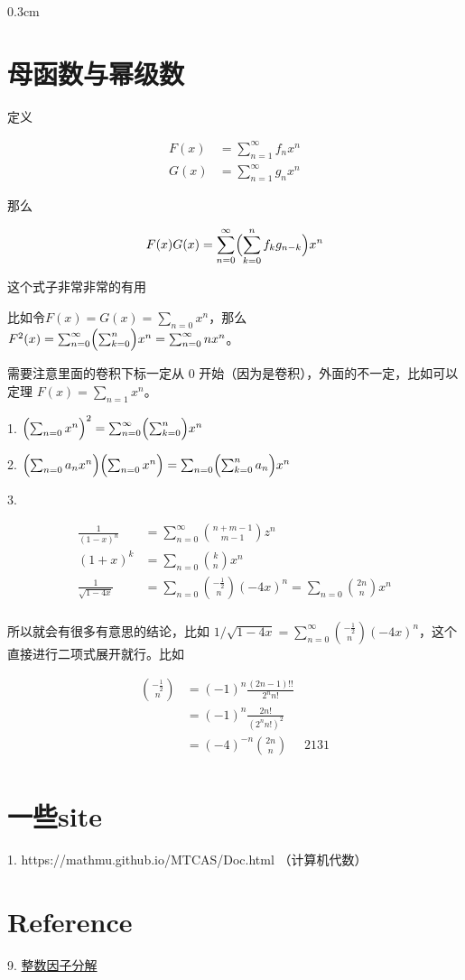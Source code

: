\documentclass{article}
\newcommand{\setParDis}{\setlength {\parskip} {0.3cm} }
\newcommand{\nident}{\setlength{\parindent}{0pt}}
\begin{document}
\setParDis

\section{母函数与幂级数}

定义 

\begin{equation}
    \begin{aligned}
        F(x)&=\sum_{n=1}^{\infty}f_nx^n\\
        G(x)&=\sum_{n=1}^{\infty}g_nx^n
    \end{aligned}
\end{equation}

那么

\begin{equation}
    F(x)G(x)=\sum_{n=0}^{\infty}\Bigl(\sum_{k=0}^nf_kg_{n-k}\Bigr)x^n
\end{equation}

这个式子非常非常的有用

比如令$F(x)=G(x)=\sum_{n=0}x^n$，那么$F^2(x)=\sum_{n=0}^{\infty}\Bigl(\sum_{k=0}^n\Bigr)x^n=\sum_{n=0}^{\infty}nx^n$。

需要注意里面的卷积下标一定从 0 开始（因为是卷积），外面的不一定，比如可以定理 $F(x)=\sum_{n=1}x^n$。

1. $\Bigl(\sum_{n=0}x^n\Bigr)^2=\sum_{n=0}^{\infty}\Bigl(\sum_{k=0}^n\Bigr)x^n$

2. $\Bigl(\sum_{n=0}a_nx^n\Bigr)\Bigl(\sum_{n=0}x^n\Bigr)=\sum_{n=0}\Bigl(\sum_{k=0}^na_n\Bigr)x^n$

3. 

\begin{equation}
    \begin{aligned}
        \frac{1}{(1-x)^n}&=\sum_{n = 0}^{\infty}\binom{n+m-1}{m-1}z^n\\
        (1+x)^k&=\sum_{n=0}\binom{k}{n}x^n\\
        \frac1{\sqrt{1-4x}}&=\sum_{n=0}\binom{-\frac12}{n}(-4x)^n=\sum_{n=0}\binom{2n}{n}x^n\\
    \end{aligned}
\end{equation}

所以就会有很多有意思的结论，比如 $1/\sqrt{1-4x}=\sum_{n=0}^{\infty}\binom{-\frac12}{n}(-4x)^n$，这个直接进行二项式展开就行。比如

\begin{equation}
    \begin{aligned}
        \binom{-\frac12}{n}&=(-1)^n\frac{(2n-1)!!}{2^nn!}\\
        &=(-1)^n\frac{2n!}{(2^nn!)^2}\\
        &=(-4)^{-n}\binom{2n}{n}
        &2131\\
    \end{aligned}
\end{equation}


\section{一些site}

1. https://mathmu.github.io/MTCAS/Doc.html （计算机代数）


\section{Reference}


9. \href{https://mathmu.github.io/MTCAS/doc/IntegerFactorization.html#sec8}{整数因子分解}
\end{document}
